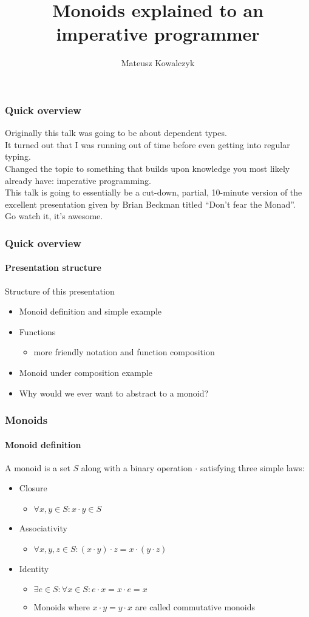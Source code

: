 \documentclass{beamer}
\title[Monoids explained]{Monoids explained to an imperative programmer}
\author{Mateusz Kowalczyk}
\institute{University of Bath}
\begin{document}
\begin{frame}
  \titlepage
\end{frame}
\begin{frame}
  \frametitle{Quick overview}
  Originally this talk was going to be about dependent types.\\
  \pause
  It turned out that I was running out of time before even getting
  into regular typing.\\
  \pause
  Changed the topic to something that builds upon knowledge you most
  likely already have: imperative programming.\\
  \pause
  This talk is going to essentially be a cut-down, partial, 10-minute
  version of the excellent presentation given by Brian Beckman titled
  ``Don't fear the Monad''.\\
  \pause
  Go watch it, it's awesome.
\end{frame}
\begin{frame}
  \frametitle{Quick overview}
  \framesubtitle{Presentation structure}
  Structure of this presentation
  \begin{itemize}[<+->]
    \item Monoid definition and simple example
    \item Functions
      \begin{itemize}
        \item more friendly notation and function composition
      \end{itemize}
    \item Monoid under composition example
    \item Why would we ever want to abstract to a monoid?
  \end{itemize}
\end{frame}
\begin{frame}
  \frametitle{Monoids}
  \framesubtitle{Monoid definition}
  A monoid is a set $S$ along with a binary
  operation $\cdot$ satisfying three simple laws:
  \pause
  \begin{itemize}[<+->]
    \item Closure
      \begin{itemize}
        \item $\forall x,y \in S: x \cdot y \in S$
      \end{itemize}
    \item Associativity
      \begin{itemize}
        \item $\forall x,y,z \in S: (x \cdot y) \cdot z = x \cdot (y
          \cdot z)$
      \end{itemize}
    \item Identity
      \begin{itemize}
        \item $\exists e \in S: \forall x \in S: e \cdot x = x \cdot e
          = x$
        \item Monoids where $x \cdot y = y \cdot x$ are called
          commutative monoids
      \end{itemize}
  \end{itemize}
\end{frame}
\end{document}
